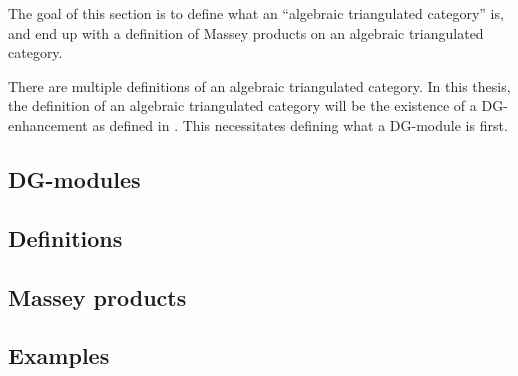 The goal of this section is to define what an ``algebraic triangulated category'' is, and end up with a definition of Massey products on an algebraic triangulated category.

There are multiple definitions of an algebraic triangulated category. In this thesis, the definition of an algebraic triangulated category will be the existence of a DG-enhancement as defined in \cite[Definition 3.1.3]{Jasso-Muro_2023}. This necessitates defining what a DG-module is first.

\subsection{DG-modules}


\subsection{Definitions}


\subsection{Massey products}


\subsection{Examples}

